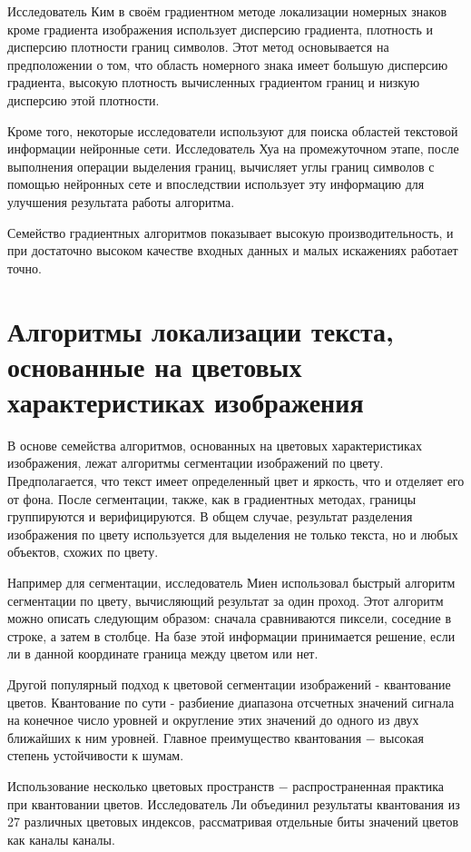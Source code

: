 \documentclass[oneside,final,14pt]{extreport}
\begin{document}
Исследователь Ким в своём градиентном методе локализации номерных знаков кроме градиента изображения использует дисперсию градиента, плотность и дисперсию плотности границ символов. Этот метод основывается на предположении о том, что область номерного знака имеет большую дисперсию градиента, высокую плотность вычисленных градиентом границ и низкую дисперсию этой плотности.

Кроме того, некоторые исследователи используют для поиска областей текстовой информации нейронные сети. Исследователь Хуа на промежуточном этапе, после выполнения операции выделения границ,  вычисляет углы границ символов с помощью нейронных сете и впоследствии использует эту информацию для улучшения результата работы алгоритма. 

Семейство градиентных алгоритмов показывает высокую производительность, и при достаточно высоком качестве входных данных и малых искажениях работает точно.

\section{Алгоритмы локализации текста, основанные на цветовых характеристиках изображения}

В основе семейства алгоритмов, основанных на цветовых характеристиках изображения, лежат алгоритмы сегментации изображений по цвету. Предполагается, что текст имеет определенный цвет и яркость, что и отделяет его от фона.  После сегментации, также, как в градиентных методах, границы группируются и верифицируются. В общем случае, результат разделения изображения по цвету используется для выделения не только текста, но и любых объектов, схожих по цвету.

Например для сегментации, исследователь Миен использовал быстрый алгоритм сегментации по цвету, вычисляющий результат за один проход. Этот алгоритм можно описать следующим образом: сначала сравниваются пиксели, соседние в строке, а затем в столбце. На базе этой информации принимается решение, если ли в данной координате граница между цветом или нет.    

Другой популярный подход к цветовой сегментации изображений - квантование цветов. Квантование по сути - разбиение диапазона отсчетных значений сигнала на конечное число уровней и округление этих значений до одного из двух ближайших к ним уровней. Главное преимущество квантования $-$ высокая степень устойчивости к шумам. 

Использование несколько цветовых пространств $-$ распространенная практика при квантовании цветов. Исследователь Ли объединил результаты квантования из 27 различных цветовых индексов, рассматривая  отдельные биты значений цветов как каналы каналы. 
\end{document}
